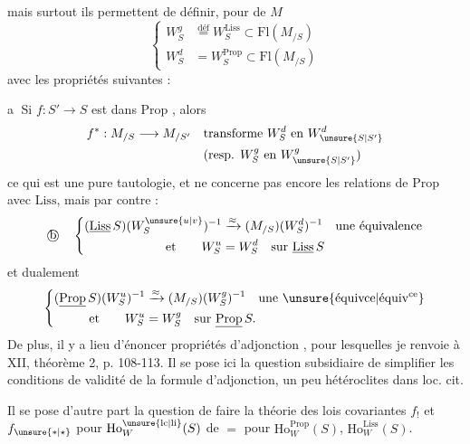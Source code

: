 mais surtout ils permettent de définir, pour  de $M$
\[
\left\{\begin{aligned}
W_S^g&\overset{\text{déf}}{=}W_S^{\mathrm{Liss}}\subset\mathrm{Fl}(M_{/S})\\
W_S^d&=W_S^{\mathrm{Prop}}\subset\mathrm{Fl}(M_{/S})
\end{aligned}\right.
\]
avec les propriétés suivantes :

\textcircled{a} Si $f:S'\to S$ est dans $\mathrm{Prop}$ , alors
\[
\begin{aligned}
f^*:M_{/S}\longrightarrow M_{/S'}\quad &\text{transforme }W_S^d\text{ en }W_{\unsure{S|S'}}^d\\
&(\text{resp. } W_S^g\text{ en }W_{\unsure{S|S'}}^g)
\end{aligned}
\]
ce qui est une pure tautologie, et ne concerne pas encore les relations de $\mathrm{Prop}$ avec $\mathrm{Liss}$, mais par contre :
\[
\text{\textcircled{b}}\quad
\left\{\begin{aligned}
(\underline{\mathrm{Liss}}\,S)(W_S^{\unsure{u|v}})^{-1}&\xrightarrow{\approx}(M_{/S})(W_S^d)^{-1}
\quad\text{une équivalence}\\
\text{et}\qquad W_S^u&=W_S^d\quad\text{sur }\underline{\mathrm{Liss}}\,S
\end{aligned}\right.
\]
et dualement
\[
\left\{\begin{aligned}
(\underline{\mathrm{Prop}}\,S)(W_S^u)^{-1}&\xrightarrow{\approx}(M_{/S})(W_S^g)^{-1}
\quad\text{une \unsure{équivce|équiv\textsuperscript{ce}}}\\
\text{et}\qquad W_S^u&=W_S^g\quad\text{sur }\underline{\mathrm{Prop}}\,S.
\end{aligned}\right.
\]
De plus, il y a lieu d'énoncer    propriétés d'adjonction , pour lesquelles je renvoie à XII, théorème  2, p. 108-113. Il se pose ici la question subsidiaire de simplifier les conditions de validité de la formule d'adjonction, un peu hétéroclites dans loc. cit.

Il se pose  d'autre part la question de faire la théorie des  lois covariantes $f_!$ et $f_{\unsure{*|\star}}$ pour $\mathrm{Ho}^{\unsure{\mathrm{lc}|\mathrm{li}}}_W(S)$ de $=$ pour $\mathrm{Ho}^{\mathrm{Prop}}_W(S)$, $\mathrm{Ho}^{\mathrm{Liss}}_W(S)$.
